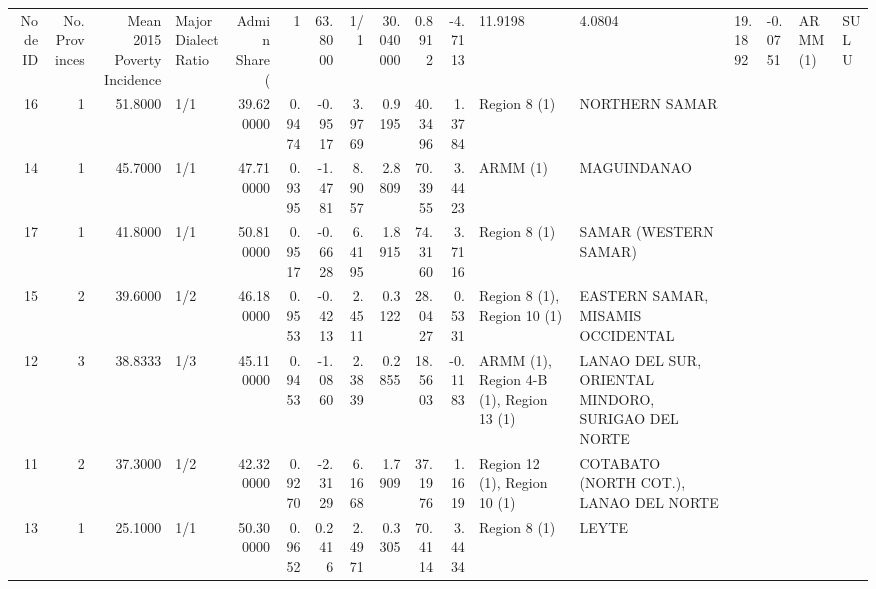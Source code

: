 \begin{tabular}{rrrlrrrrrrrll}
\toprule
Node ID & No. Provinces & Mean 2015 Poverty Incidence & Major Dialect Ratio & Admin Share (%
 & 1 & {} \color[HTML]{F1F1F1} 63.8000 & 1/1 & {} \color[HTML]{F1F1F1} 30.040000 & 0.8912 & -4.7113 & 11.9198 & 4.0804 & 19.1892 & -0.0751 & ARMM (1) & SULU \\
16 & 1 & {} \color[HTML]{F1F1F1} 51.8000 & 1/1 & {} \color[HTML]{000000} 39.620000 & 0.9474 & -0.9517 & 3.9769 & 0.9195 & 40.3496 & 1.3784 & Region 8 (1) & NORTHERN SAMAR \\
14 & 1 & {} \color[HTML]{000000} 45.7000 & 1/1 & {} \color[HTML]{F1F1F1} 47.710000 & 0.9395 & -1.4781 & 8.9057 & 2.8809 & 70.3955 & 3.4423 & ARMM (1) & MAGUINDANAO \\
17 & 1 & {} \color[HTML]{000000} 41.8000 & 1/1 & {} \color[HTML]{F1F1F1} 50.810000 & 0.9517 & -0.6628 & 6.4195 & 1.8915 & 74.3160 & 3.7116 & Region 8 (1) & SAMAR (WESTERN SAMAR) \\
15 & 2 & {} \color[HTML]{000000} 39.6000 & 1/2 & {} \color[HTML]{F1F1F1} 46.180000 & 0.9553 & -0.4213 & 2.4511 & 0.3122 & 28.0427 & 0.5331 & Region 8 (1), Region 10 (1) & EASTERN SAMAR, MISAMIS OCCIDENTAL \\
12 & 3 & {} \color[HTML]{000000} 38.8333 & 1/3 & {} \color[HTML]{000000} 45.110000 & 0.9453 & -1.0860 & 2.3839 & 0.2855 & 18.5603 & -0.1183 & ARMM (1), Region 4-B (1), Region 13 (1) & LANAO DEL SUR, ORIENTAL MINDORO, SURIGAO DEL NORTE \\
11 & 2 & {} \color[HTML]{000000} 37.3000 & 1/2 & {} \color[HTML]{000000} 42.320000 & 0.9270 & -2.3129 & 6.1668 & 1.7909 & 37.1976 & 1.1619 & Region 12 (1), Region 10 (1) & COTABATO (NORTH COT.), LANAO DEL NORTE \\
13 & 1 & {} \color[HTML]{000000} 25.1000 & 1/1 & {} \color[HTML]{F1F1F1} 50.300000 & 0.9652 & 0.2416 & 2.4971 & 0.3305 & 70.4114 & 3.4434 & Region 8 (1) & LEYTE \\

\end{tabular}
